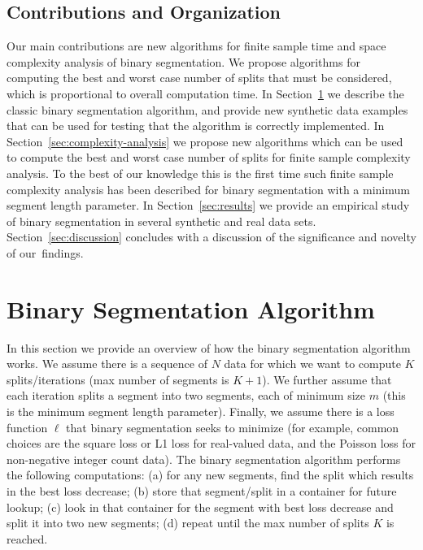 \documentclass[algorithms,article,accept,oneauthor]{Definitions/mdpi}
\begin{document}
\subsection{Contributions and Organization}
Our main contributions are new algorithms for finite sample time and space complexity analysis of binary segmentation.
We propose algorithms for computing the best and worst case number of splits that must be considered, which is proportional to overall computation time.
In Section~\ref{sec:bs-algo} we describe the classic binary segmentation algorithm, and provide new synthetic data examples that can be used for testing that the algorithm is correctly implemented.
In Section~\ref{sec:complexity-analysis} we propose new algorithms which can be used to compute the best and worst case number of splits for finite sample complexity analysis.
To the best of our knowledge this is the first time such finite sample complexity analysis has been described for binary segmentation with a minimum segment length parameter.
In Section~\ref{sec:results} we provide an empirical study of binary segmentation in several synthetic and real data sets.
Section~\ref{sec:discussion} concludes with a discussion of the significance and novelty of our~findings.

\section{Binary Segmentation Algorithm}
\label{sec:bs-algo}

In this section we provide an overview of how the binary segmentation algorithm works. 
We assume there is a sequence of $N$ data for which we want to compute $K$ splits/iterations (max number of segments is $K+1$). 
We further assume that each iteration splits a segment into two segments, each of minimum size $m$ (this is the minimum segment length parameter).
Finally, we assume there is a loss function $\ell$ that binary segmentation seeks to minimize (for example, common choices are the square loss or L1 loss for real-valued data, and the Poisson loss for non-negative integer count data).
The binary segmentation algorithm performs the following computations: 
(a) for any new segments, find the split which results in the best loss decrease; (b) store that segment/split in a container for future lookup; 
(c) look in that container for the  segment with best loss decrease and split it into two new segments; 
(d) repeat until the max number of splits $K$ is reached.
\end{document}
